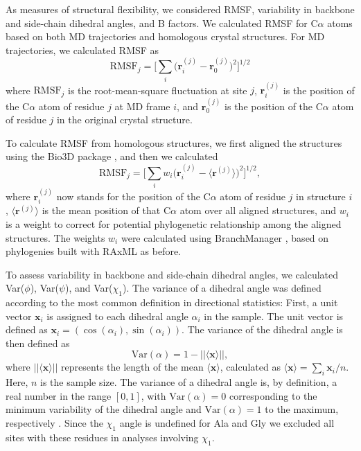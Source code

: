 \documentclass[smallextended]{svjour3}
\begin{document}
As measures of structural flexibility, we considered RMSF, variability in backbone and side-chain dihedral angles, and B factors. We calculated RMSF for C$\alpha$ atoms based on both MD trajectories and homologous crystal structures. For MD trajectories, we calculated RMSF as
\begin{equation}
    \text{RMSF}_j = \Big[\sum_i \big(\mathbf{r}_i^{(j)}-\mathbf{r}_0^{(j)}\big)^2\Big]^{1/2}
\end{equation}
where $\text{RMSF}_j$ is the root-mean-square fluctuation at site $j$, $\mathbf{r}_i^{(j)}$ is the position of the C$\alpha$ atom of residue $j$ at MD frame $i$, and $\mathbf{r}_0^{(j)}$ is the position of the C$\alpha$ atom of residue $j$ in the original crystal structure.

To calculate RMSF from homologous structures, we first aligned the structures using the Bio3D package \citep{Grantetal2006}, and then we calculated
\begin{equation}
    \text{RMSF}_j = \Big[\sum_i w_i\big(\mathbf{r}_i^{(j)}-\langle\mathbf{r}^{(j)}\rangle\big)^2\Big]^{1/2},
\end{equation}
where $\mathbf{r}_i^{(j)}$ now stands for the position of the C$\alpha$ atom of residue $j$ in structure $i$, $\langle\mathbf{r}^{(j)}\rangle$ is the mean position of that C$\alpha$ atom over all aligned structures, and $w_i$ is a weight to correct for potential phylogenetic relationship among the aligned structures. The weights $w_i$ were calculated using BranchManager \citep{StoneSidow2007}, based on phylogenies built with RAxML as before.

To assess variability in backbone and side-chain dihedral angles, we calculated Var($\phi$), Var($\psi$), and Var($\chi_1$). The variance of a dihedral angle was defined according to the most common definition in directional statistics:
First, a unit vector $\mathbf{x}_i$ is assigned to each dihedral angle $\alpha_i$ in the sample. The unit vector is defined as $\mathbf{x}_i = ( \cos (\alpha_i), \sin (\alpha_i) )$.
The variance of the dihedral angle is then defined as
\begin{equation}
\text{Var}(\alpha) = 1 - ||\langle \mathbf{x}\rangle||,
\end{equation}
where $||\langle \mathbf{x}\rangle||$ represents the length of the mean $\langle \mathbf{x}\rangle$, calculated as $\langle \mathbf{x}\rangle=\sum_i \mathbf{x}_i/n$. Here, $n$ is the sample size. The variance of a dihedral angle is, by definition, a real number in the range $[0,1]$, with $\text{Var}(\alpha) = 0$ corresponding to the minimum variability of the dihedral angle and $\text{Var}(\alpha) = 1$ to the maximum, respectively \citep{Berens2009}. Since the $\chi_1$ angle is undefined for Ala and Gly we excluded all sites with these residues in analyses involving $\chi_1$.
\end{document}
